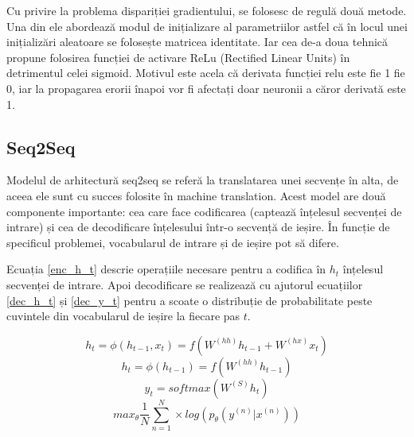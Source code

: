 Cu privire la problema dispariției gradientului, se folosesc de regulă două metode. Una din ele abordează modul de inițializare al parametriilor astfel că în locul unei inițializări aleatoare se folosește matricea identitate. Iar cea de-a doua tehnică propune folosirea funcției de activare ReLu (Rectified Linear Units) în detrimentul celei sigmoid. Motivul este acela că derivata funcției relu este fie 1 fie 0, iar la propagarea erorii înapoi vor fi afectați doar neuronii a căror derivată este 1.

\subsection{Seq2Seq}

Modelul de arhitectură seq2seq se referă la translatarea unei secvențe în alta, de aceea ele sunt cu succes folosite în machine translation.
Acest model are două componente importante: cea care face codificarea (captează înțelesul secvenței de intrare) și cea de decodificare înțelesului într-o secvență de ieșire. În funcție de specificul problemei, vocabularul de intrare și de ieșire pot să difere.

Ecuația \ref{enc_h_t} descrie operațiile necesare pentru a codifica în $h_t$ înțelesul secvenței de intrare. Apoi decodificare se realizează cu ajutorul ecuațiilor \ref{dec_h_t} și \ref{dec_y_t} pentru a scoate o distribuție de probabilitate peste cuvintele din vocabularul de ieșire la fiecare pas $t$.


\begin{equation}
h_t = \phi(h_{t-1}, x_t) = f(W^{(hh)} h_{t-1} + W^{(hx)} x_t)
\label{enc_h_t}
\end{equation}
\begin{equation}
h_t = \phi(h_{t-1}) = f(W^{(hh)} h_{t-1})
\label{dec_h_t}
\end{equation}
\begin{equation}
y_t = softmax(W^{(S)} h_t) 
\label{dec_y_t}
\end{equation}
\begin{equation}
max_{\theta}\frac{1}{N} \sum_{n=1}^{N}\times log(p_\theta(y^{(n)}|x^{(n)}))
\label{seq2seq_loss}
\end{equation}

